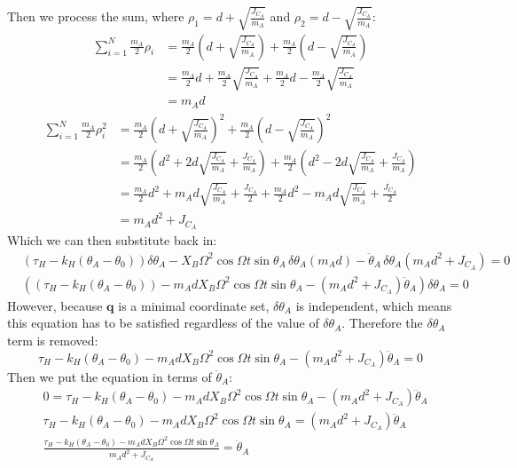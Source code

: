 \documentclass[titlepage]{article}
\begin{document}
Then we process the sum, where $\rho_1=d+\sqrt{\frac{J_{C_A}}{m_A}}$ and $\rho_2=d-\sqrt{\frac{J_{C_A}}{m_A}}$:
\begin{equation}
	\begin{split}
		\sum_{i=1}^{N}\frac{m_A}{2}\rho_i&=\frac{m_A}{2}\left(d+\sqrt{\frac{J_{C_A}}{m_A}}\right)+\frac{m_A}{2}\left(d-\sqrt{\frac{J_{C_A}}{m_A}}\right) \\
		&=\frac{m_A}{2}d+\frac{m_A}{2}\sqrt{\frac{J_{C_A}}{m_A}}+\frac{m_A}{2}d-\frac{m_A}{2}\sqrt{\frac{J_{C_A}}{m_A}} \\
		&=m_Ad
	\end{split}
\end{equation}
\begin{equation}
	\begin{split}
		\sum_{i=1}^{N}\frac{m_A}{2}\rho_i^2&=\frac{m_A}{2}\left(d+\sqrt{\frac{J_{C_A}}{m_A}}\right)^2+\frac{m_A}{2}\left(d-\sqrt{\frac{J_{C_A}}{m_A}}\right)^2 \\
		&=\frac{m_A}{2}\left(d^2+2d\sqrt{\frac{J_{C_A}}{m_A}}+\frac{J_{C_A}}{m_A}\right)+\frac{m_A}{2}\left(d^2-2d\sqrt{\frac{J_{C_A}}{m_A}}+\frac{J_{C_A}}{m_A}\right) \\
		&=\frac{m_A}{2}d^2+m_Ad\sqrt{\frac{J_{C_A}}{m_A}}+\frac{J_{C_A}}{2}+\frac{m_A}{2}d^2-m_Ad\sqrt{\frac{J_{C_A}}{m_A}}+\frac{J_{C_A}}{2} \\
		&=m_Ad^2+J_{C_A}
	\end{split}
\end{equation}
Which we can then substitute back in:
\begin{equation}
	\begin{split}
		&\left(\tau_H-k_H(\theta_A-\theta_0)\right)\delta\theta_A-X_B\Omega^2\cos\Omega t\sin\theta_A\,\delta\theta_A\left(m_Ad\right)-\ddot{\theta}_A\,\delta\theta_A\left(m_Ad^2+J_{C_A}\right)=0 \\
		&\left(\left(\tau_H-k_H(\theta_A-\theta_0)\right)-m_AdX_B\Omega^2\cos\Omega t\sin\theta_A-\left(m_Ad^2+J_{C_A}\right)\ddot{\theta}_A\right)\delta\theta_A=0
	\end{split}
\end{equation}
However, because $\boldsymbol{q}$ is a minimal coordinate set, $\delta\theta_A$ is independent, which means this equation has to be satisfied regardless of the value of $\delta\theta_A$. Therefore the $\delta\theta_A$ term is removed:
\begin{equation}
	\tau_H-k_H(\theta_A-\theta_0)-m_AdX_B\Omega^2\cos\Omega t\sin\theta_A-\left(m_Ad^2+J_{C_A}\right)\ddot{\theta}_A=0
\end{equation}
Then we put the equation in terms of $\ddot{\theta}_A$:
\begin{equation}
	\begin{split}
		&0=\tau_H-k_H(\theta_A-\theta_0)-m_AdX_B\Omega^2\cos\Omega t\sin\theta_A-\left(m_Ad^2+J_{C_A}\right)\ddot{\theta}_A \\
		&\tau_H-k_H(\theta_A-\theta_0)-m_AdX_B\Omega^2\cos\Omega t\sin\theta_A=\left(m_Ad^2+J_{C_A}\right)\ddot{\theta}_A \\
		&\frac{\tau_H-k_H(\theta_A-\theta_0)-m_AdX_B\Omega^2\cos\Omega t\sin\theta_A}{m_Ad^2+J_{C_A}}=\ddot{\theta}_A
	\end{split}
\end{equation}
\end{document}
